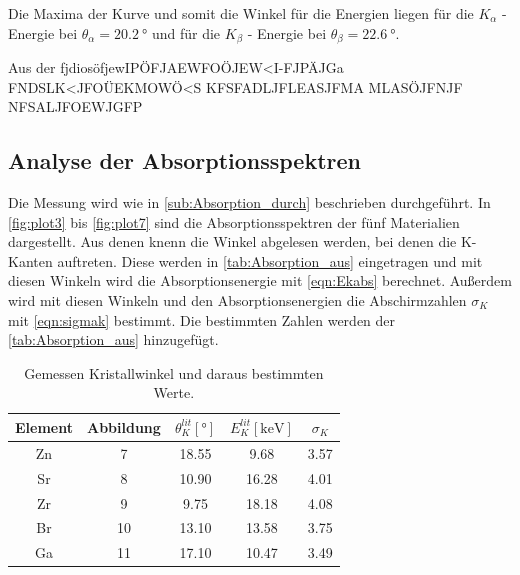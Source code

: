 Die Maxima der Kurve und somit die Winkel für die Energien liegen für die 
$K_\alpha$ -Energie  bei $\theta_\alpha=\qty{20.2}{\degree}$ und für die $K_\beta$ - Energie
bei $\theta_\beta=\qty{22.6}{\degree}$.

Aus der fjdiosöfjewIPÖFJAEWFOÖJEW<I-FJPÄJGa
FNDSLK<JFOÜEKMOWÖ<S
KFSFADLJFLEASJFMA
MLASÖJFNJF
NFSALJFOEWJGFP



\subsection{Analyse der Absorptionsspektren} %
\label{sub:Absorption_aus}
Die Messung wird wie in \autoref{sub:Absorption_durch} beschrieben durchgeführt.
In \autoref{fig:plot3} bis \ref{fig:plot7} sind die Absorptionsspektren der fünf Materialien dargestellt.
Aus denen knenn die Winkel abgelesen werden, bei denen die K-Kanten auftreten.
Diese werden in \autoref{tab:Absorption_aus} eingetragen und mit diesen Winkeln wird die Absorptionsenergie mit \autoref{eqn:Ekabs} berechnet.
Außerdem wird mit diesen Winkeln und den Absorptionsenergien die Abschirmzahlen $\sigma_K$ mit \autoref{eqn:sigmak} bestimmt.
Die bestimmten Zahlen werden der \autoref{tab:Absorption_aus} hinzugefügt.

\begin{table}[H]
  \centering
  \caption{Gemessen Kristallwinkel und daraus bestimmten Werte.}
  \label{tab:Absorption_aus}
  \begin{tabular}{c S[table-format=2.0] S S S[table-format=1.2] }
  \toprule
  {Element} & {Abbildung} & {$\theta_{K}^{lit} [\si{\degree}]$} & {$E_{K}^{lit} [\si{\kilo\electronvolt}]$}& {$\sigma_K$}\\
  \midrule
    Zn & 7  & 18.55 & 9.68  & 3.57 \\
    Sr & 8  & 10.90 & 16.28 & 4.01 \\
    Zr & 9  &  9.75 & 18.18 & 4.08 \\
    Br & 10 & 13.10 & 13.58 & 3.75 \\
    Ga & 11 & 17.10 & 10.47 & 3.49 \\ 
  \bottomrule
  \end{tabular}
\end{table}

